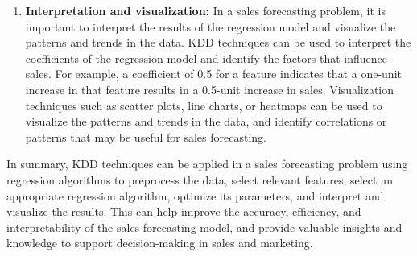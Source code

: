 \begin{enumerate}
	\item \textbf{Interpretation and visualization:} In a sales forecasting problem, it is important to interpret the results of the regression model and visualize the patterns and trends in the data. KDD techniques can be used to interpret the coefficients of the regression model and identify the factors that influence sales. For example, a coefficient of 0.5 for a feature indicates that a one-unit increase in that feature results in a 0.5-unit increase in sales. Visualization techniques such as scatter plots, line charts, or heatmaps can be used to visualize the patterns and trends in the data, and identify correlations or patterns that may be useful for sales forecasting. \cite{fayyad:1996}
	
\end{enumerate}	

In summary, KDD techniques can be applied in a sales forecasting problem using regression algorithms to preprocess the data, select relevant features, select an appropriate regression algorithm, optimize its parameters, and interpret and visualize the results. This can help improve the accuracy, efficiency, and interpretability of the sales forecasting model, and provide valuable insights and knowledge to support decision-making in sales and marketing.




